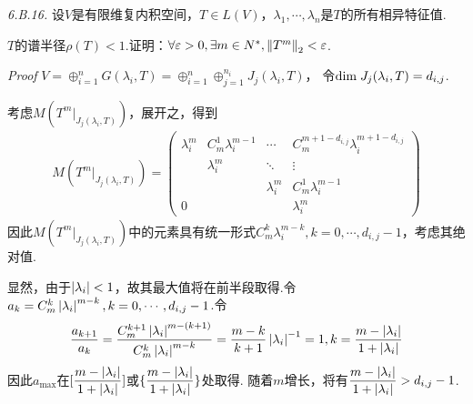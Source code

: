 \textit{6.B.16.}
设\(V\)是有限维复内积空间，\(T \in L(V)\)，\(\lambda_1,\cdots,\lambda_n\)是\(T\)的所有相异特征值.

\(T\)的谱半径\(\rho(T)<1\).证明：\(\forall \varepsilon>0,\exists m \in N^*,\left\lVert T^m \right\rVert_2<\varepsilon\).

\textit{Proof}
\(V=\oplus_{i=1}^n G(\lambda_i,T)=\oplus_{i=1}^n\oplus_{j=1}^{n_i} J_j(\lambda_i,T)\)，
令\(\mathrm{dim \;} J_j(\lambda_i,T)=d_{i,j}\).

考虑\(M(T^m|_{J_j(\lambda_i,T)})\)，展开之，得到
    \begin{align*}
        M(T^m|_{J_j(\lambda_i,T)})=
        \begin{pmatrix}
            \lambda_i^m & C_m^1 \lambda_i^{m-1} & \cdots      & C_m^{m+1-d_{i,j}} \lambda_i^{m+1-d_{i,j}} \\
                        & \lambda_i^m           & \ddots      & \vdots                                    \\
                        &                       & \lambda_i^m & C_m^1 \lambda_i^{m-1}                     \\
                 0      &                       &             & \lambda_i^m
        \end{pmatrix}
    \end{align*}
因此\(M(T^m|_{J_j(\lambda_i,T)})\)中的元素具有统一形式\(C_m^k \lambda_i^{m-k},k=0,\cdots,d_{i,j}-1\)，考虑其绝对值.

显然，由于\(\left\lvert \lambda_i \right\rvert<1\)，故其最大值将在前半段取得.令\(a_k=C_m^k \left\lvert \lambda_i \right\rvert^{m-k},k=0,\cdots,d_{i,j}-1\).令
    \begin{align*}
        \dfrac{a_{k+1}}{a_k}=\dfrac{C_m^{k+1}\left\lvert \lambda_i \right\rvert^{m-(k+1)}}{C_m^k \left\lvert \lambda_i \right\rvert^{m-k}}=
        \dfrac{m-k}{k+1} \left\lvert \lambda_i \right\rvert^{-1}=1,k=\dfrac{m-\left\lvert \lambda_i \right\rvert}{1+\left\lvert \lambda_i \right\rvert}
    \end{align*}
因此\(a_{\max}\)在\([\dfrac{m-\left\lvert \lambda_i \right\rvert}{1+\left\lvert \lambda_i \right\rvert}]\)或\(\{\dfrac{m-\left\lvert \lambda_i \right\rvert}{1+\left\lvert \lambda_i \right\rvert}\}\)处取得.
随着\(m\)增长，将有\(\dfrac{m-\left\lvert \lambda_i \right\rvert}{1+\left\lvert \lambda_i \right\rvert}>d_{i,j}-1\).

